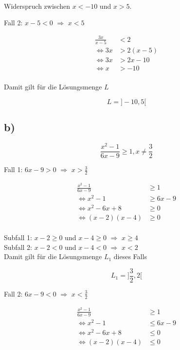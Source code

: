 \documentclass[a4paper, 11pt]{article}
\begin{document}
Widerspruch zwischen \(x < -10\) und \(x > 5\).

Fall 2: \(x - 5 < 0\) \(\Rightarrow\) \(x < 5\)

\begin{align*}
    \frac{3x}{x-5} &< 2 \\
    \Leftrightarrow 3x &> 2(x-5) \\
    \Leftrightarrow 3x &> 2x-10 \\
    \Leftrightarrow x &> -10 \\
\end{align*}

Damit gilt für die Lösungsmenge \(L\)

$$ L = ]-10, 5[ $$

\pagebreak

\subsection{b)}
\label{sec:org8e03fce}
$$ \frac{x^2 - 1}{6x - 9} \geq 1, x \neq \frac{3}{2} $$

Fall 1: \(6x - 9 > 0\) \(\Rightarrow\) \(x > \frac{3}{2}\)

\begin{align*}
     \frac{x^2 - 1}{6x - 9} &\geq 1 \\
    \Leftrightarrow x^2 - 1 &\geq 6x - 9 \\
    \Leftrightarrow x^2 - 6x + 8 &\geq 0 \\
    \Leftrightarrow (x - 2)(x - 4) &\geq 0 \\
\end{align*}

Subfall 1: \(x - 2 \geq 0\) und \(x - 4 \geq 0\) \(\Rightarrow\) \(x \geq 4\) \\
Subfall 2: \(x - 2 < 0\) und \(x - 4 < 0\) \(\Rightarrow\) \(x < 2\) \\

Damit gilt für die Lösungsmenge \(L_1\) dieses Falls

$$ L_1 = ]\frac{3}{2}, 2[ $$

Fall 2: \(6x - 9 < 0\) \(\Rightarrow\) \(x < \frac{3}{2}\)

\begin{align*}
    \frac{x^2 - 1}{6x - 9} &\geq 1 \\
    \Leftrightarrow x^2 - 1 &\leq 6x - 9 \\
    \Leftrightarrow x^2 - 6x + 8 &\leq 0 \\
    \Leftrightarrow (x - 2)(x - 4) &\leq 0 \\
\end{align*}
\end{document}
